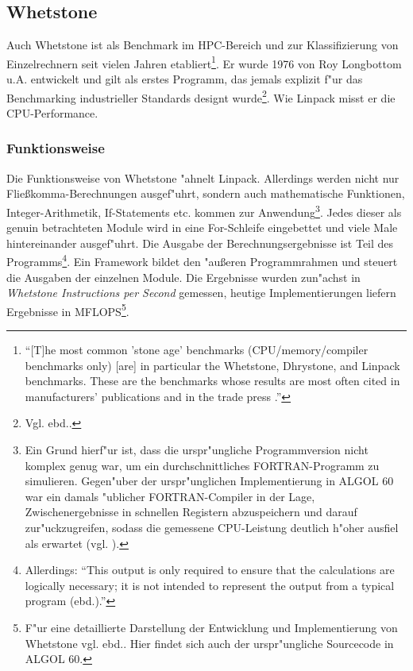 \subsection{Whetstone}\label{Whetstone}

Auch Whetstone ist als Benchmark im HPC-Bereich und zur Klassifizierung von Einzelrechnern seit vielen Jahren etabliert\footnote{"`[T]he most common 'stone age' benchmarks (CPU/memory/compiler benchmarks only) [are] in particular the Whetstone, Dhrystone, and Linpack benchmarks. These are the benchmarks whose results are most often cited in manufacturers' publications and in the trade press \cite{wei90}."'}. Er wurde 1976 von Roy Longbottom u.A. entwickelt und gilt als erstes Programm, das jemals explizit f"ur das Benchmarking industrieller Standards designt wurde\footnote{Vgl. ebd..}. Wie Linpack misst er die CPU-Performance. 

\subsubsection{Funktionsweise}\label{Funktionsweise Whetstone}

Die Funktionsweise von Whetstone "ahnelt Linpack. Allerdings werden nicht nur Flie\ss komma-Berechnungen ausgef"uhrt, sondern auch mathematische Funktionen, Integer-Arithmetik, If-Statements etc. kommen zur Anwendung\footnote{Ein Grund hierf"ur ist, dass die urspr"ungliche Programmversion nicht komplex genug war, um ein durchschnittliches FORTRAN-Programm zu simulieren. Gegen"uber der urspr"unglichen Implementierung in ALGOL 60 war ein damals "ublicher FORTRAN-Compiler in der Lage, Zwischenergebnisse in schnellen Registern abzuspeichern und darauf zur"uckzugreifen, sodass die gemessene CPU-Leistung deutlich h"oher ausfiel als erwartet (vgl. \cite{cur76}).}. Jedes dieser als genuin betrachteten Module wird in eine For-Schleife eingebettet und viele Male  hintereinander ausgef"uhrt. Die Ausgabe der Berechnungsergebnisse ist Teil des Programms\footnote{Allerdings: "`This output is only required to ensure that the calculations are logically necessary; it is not intended to represent the output from a typical program (ebd.)."'}. Ein Framework bildet den "au\ss eren Programmrahmen und steuert die Ausgaben der einzelnen Module. Die Ergebnisse wurden zun"achst in \textit{Whetstone Instructions per Second} gemessen, heutige Implementierungen liefern Ergebnisse in MFLOPS\footnote{F"ur eine detaillierte Darstellung der Entwicklung und Implementierung von Whetstone vgl. ebd.. Hier findet sich auch der urspr"ungliche Sourcecode in ALGOL 60.}. 

